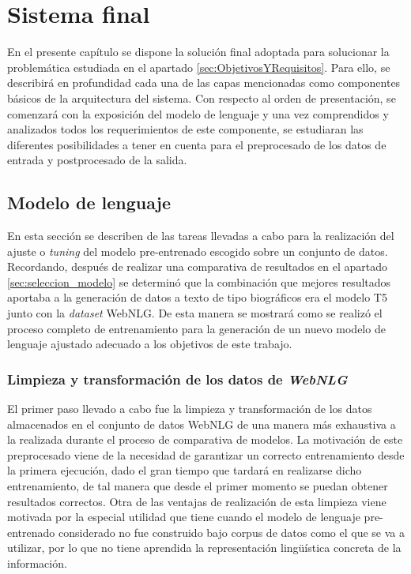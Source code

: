 \chapter{Sistema final}
\label{cap:sistemafinal}

En el presente capítulo se dispone la solución final adoptada para solucionar la problemática estudiada en el apartado \ref{sec:ObjetivosYRequisitos}. Para ello, se describirá en profundidad cada una de las capas mencionadas como componentes básicos de la arquitectura del sistema. Con respecto al orden de presentación, se comenzará con la exposición del modelo de lenguaje y una vez comprendidos y analizados todos los requerimientos de este componente, se estudiaran las diferentes posibilidades a tener en cuenta para el preprocesado de los datos de entrada y postprocesado de la salida.


\section{Modelo de lenguaje}

En esta sección se describen de las tareas llevadas a cabo para la realización del ajuste o \textit{tuning} del modelo pre-entrenado escogido sobre un conjunto de datos. Recordando, después de realizar una comparativa de resultados en el apartado \ref{sec:seleccion_modelo} se determinó que la combinación que mejores resultados aportaba a la generación de datos a texto de tipo biográficos era el modelo T5 junto con la \textit{dataset} WebNLG. De esta manera se mostrará como se realizó el proceso completo de entrenamiento para la generación de un nuevo modelo de lenguaje ajustado adecuado a los objetivos de este trabajo.

\subsection{Limpieza y transformación de los datos de \textit{WebNLG}}
\label{sec:webnlg_limpieza}

El primer paso llevado a cabo fue la limpieza y transformación de los datos almacenados en el conjunto de datos WebNLG de una manera más exhaustiva a la realizada durante el proceso de comparativa de modelos. La motivación de este preprocesado viene de la necesidad de garantizar un correcto entrenamiento desde la primera ejecución, dado el gran tiempo que tardará en realizarse dicho entrenamiento, de tal manera que desde el primer momento se puedan obtener resultados correctos. Otra de las ventajas de realización de esta limpieza viene motivada por la especial utilidad que tiene cuando el modelo de lenguaje pre-entrenado considerado no fue construido bajo corpus de datos como el que se va a utilizar, por lo que no tiene aprendida la representación lingüística concreta de la información.


